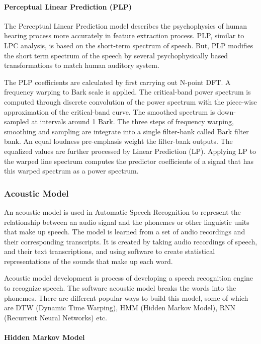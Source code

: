 \paragraph{Perceptual Linear Prediction (PLP)} \mbox{}


The Perceptual Linear Prediction model describes the psychophysics of human hearing process more accurately in feature extraction process. PLP, similar to LPC analysis, is based on the short-term spectrum of speech. But, PLP modifies the short term spectrum of the speech by several psychophysically based transformations to match human auditory system.

The PLP coefficients are calculated by first carrying out N-point DFT. A frequency warping to Bark scale is applied. The critical-band power spectrum is computed through discrete convolution of the power spectrum with the piece-wise approximation of the critical-band curve. The smoothed spectrum is down-sampled at intervals around 1 Bark. The three steps of frequency warping, smoothing and sampling are integrate into a single filter-bank called Bark filter bank. An equal loudness pre-emphasis weight the filter-bank outputs. The equalized values are further processed by Linear Prediction (LP). Applying LP to the warped line spectrum computes the predictor coefficients of a signal that has this warped spectrum as a power spectrum. 

\subsubsection{Acoustic Model}
An acoustic model is used in Automatic Speech Recognition to represent the relationship between an audio signal and the phonemes or other linguistic units that make up speech. The model is learned from a set of audio recordings and their corresponding transcripts. It is created by taking audio recordings of speech, and their text transcriptions, and using software to create statistical representations of the sounds that make up each word.


Acoustic model development is process of developing a speech recognition engine to recognize speech. The software acoustic model breaks the words into the phonemes. There are different popular ways to build this model, some of which are DTW (Dynamic Time Warping), HMM (Hidden Markov Model), RNN (Recurrent Neural Networks) etc.


\paragraph{Hidden Markov Model} \mbox{}\\

